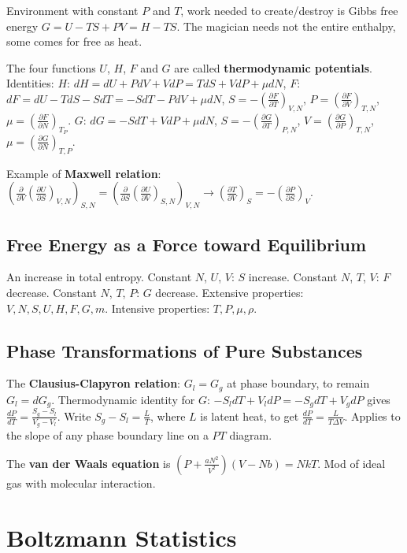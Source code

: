 \documentclass[11pt,twocolumn]{amsart}
\begin{document}
Environment with constant $P$ and $T$, work needed to create/destroy is Gibbs free energy $G = U - TS + PV = H - TS$. The magician needs not the entire enthalpy, some comes for free as heat.

The four functions $U$, $H$, $F$ and $G$ are called \textbf{thermodynamic potentials}. Identities: $H$: $dH = dU + PdV + VdP = TdS + VdP + \mu dN$, $F$: $dF = dU - TdS - SdT = -SdT - PdV + \mu dN$, $S = -\left(\frac{\partial F}{\partial T} \right)_{V,N}$, $P = \left(\frac{\partial F}{\partial V} \right)_{T,N} $, $\mu = \left( \frac{\partial F}{\partial  N} \right)_{T_P} $. $G$: $dG = -SdT + VdP + \mu dN $, $S = - \left(\frac{\partial G}{\partial T} \right)_{P,N}$, $V = \left(\frac{\partial G}{\partial P} \right)_{T,N}$, $\mu = \left(\frac{\partial G}{\partial N} \right)_{T,P}$.

Example of \textbf{Maxwell relation}: $\left(\frac{\partial}{\partial V}\left(\frac{\partial U}{\partial S} \right)_{V,N} \right)_{S,N} = \left(\frac{\partial}{\partial S}\left(\frac{\partial U}{\partial V} \right)_{S,N} \right)_{V,N} \rightarrow \left(\frac{\partial T}{\partial V} \right)_S = - \left(\frac{\partial P}{\partial S} \right)_V$.

\subsection{Free Energy as a Force toward Equilibrium}
An increase in total entropy. Constant $N$, $U$, $V$: $S$ increase. Constant $N$, $T$, $V$: $F$ decrease. Constant $N$, $T$, $P$: $G$ decrease. Extensive properties: $V,N,S,U,H,F,G,m$. Intensive properties: $T,P,\mu, \rho$.

\subsection{Phase Transformations of Pure Substances}
The \textbf{Clausius-Clapyron relation}: $G_l = G_g$ at phase boundary, to remain $G_l = dG_g$. Thermodynamic identity for $G$:  $-S_ldT + V_ldP = -S_gdT + V_gdP$ gives $\frac{dP}{dT} = \frac{S_g-S_l}{V_g-V_l}$. Write $S_g-S_l = \frac{L}{T}$, where $L$ is latent heat, to get $\frac{dP}{dT} = \frac{L}{T\Delta V}$. Applies to the slope of any phase boundary line on a $PT$ diagram.

The \textbf{van der Waals equation} is $\left(P + \frac{aN^2}{V^2}\right)(V-Nb) = NkT$. Mod of ideal gas with molecular interaction.

\section{Boltzmann Statistics}
\end{document}
